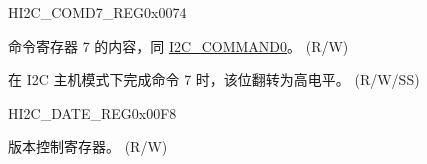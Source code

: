 \begin{register}{H}{I2C\_COMD7\_REG}{0x0074}\label{regdesc:I2CCOMD7REG}
%
%
%
\regnewline%
\begin{regdesc}\begin{reglist}
\label{fielddesc:I2CCOMMAND7}\item [I2C\_COMMAND7] 命令寄存器 7 的内容，同 \hyperref[fielddesc:I2CCOMMAND0]{I2C\_COMMAND0}。 (R/W)
\label{fielddesc:I2CCOMMAND7DONE}\item [I2C\_COMMAND7\_DONE] 在 I2C 主机模式下完成命令 7 时，该位翻转为高电平。 (R/W/SS)
\end{reglist}\end{regdesc}
\end{register}


\begin{register}{H}{I2C\_DATE\_REG}{0x00F8}\label{regdesc:I2CDATEREG}
%
\regnewline%
\begin{regdesc}\begin{reglist}
\label{fielddesc:I2CDATE}\item [I2C\_DATE] 版本控制寄存器。 (R/W)
\end{reglist}\end{regdesc}
\end{register}
